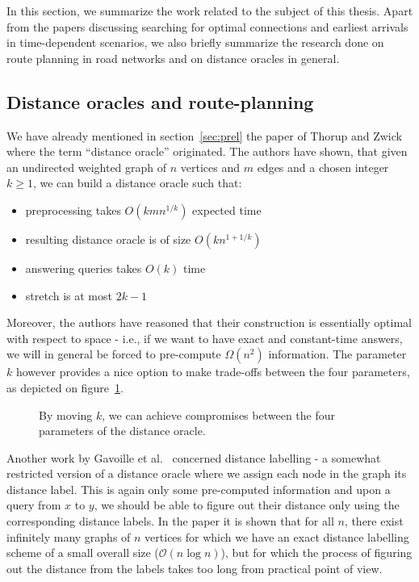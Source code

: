 In this section, we summarize the work related to the subject of this thesis. Apart from the papers discussing searching for optimal connections and earliest arrivals in time-dependent scenarios, we also briefly summarize the research done on route planning in road networks and on distance oracles in general. \\

\subsection{Distance oracles and route-planning}

	\noindent We have already mentioned in section~\ref{sec:prel} the paper of Thorup and Zwick~\cite{apxdo05} where the term ``distance oracle'' originated. The authors have shown, that given an undirected weighted graph of $n$ vertices and $m$ edges and a chosen integer $k \geq 1$, we can build a distance oracle such that:
	\begin{itemize}
    	\item preprocessing takes $O(kmn^{1/k})$ expected time
        \item resulting distance oracle is of size $O(kn^{1 + 1/k})$
        \item answering queries takes $O(k)$ time
        \item stretch is at most $2k - 1$ 
	\end{itemize}
	\hspace{\fill}
	
	\noindent Moreover, the authors have reasoned that their construction is essentially optimal with respect to space - i.e., if we want to have exact and constant-time answers, we will in general be forced to pre-compute $\Omega(n^2)$ information. The parameter $k$ however provides a nice option to make trade-offs between the four parameters, as depicted on figure~\ref{fig:compr}.\\
	
	\begin{figure}[h!]
        \begin{center}
        \end{center}
		\caption{\label{fig:compr} By moving $k$, we can achieve compromises between the four parameters of the distance oracle.}
	\end{figure}
	
	\noindent Another work by Gavoille et al.~\cite{distlabel04} concerned distance labelling - a somewhat restricted version of a distance oracle where we assign each node in the graph its distance label. This is again only some pre-computed information and upon a query from $x$ to $y$, we should be able to figure out their distance only using the corresponding distance labels. In the paper it is shown that for all $n$, there exist infinitely many graphs of $n$ vertices for which we have an exact distance labelling scheme of a small overall size ($\mathcal{O}(n \log n)$), but for which the process of figuring out the distance from the labels takes too long from practical point of view. \\
	
